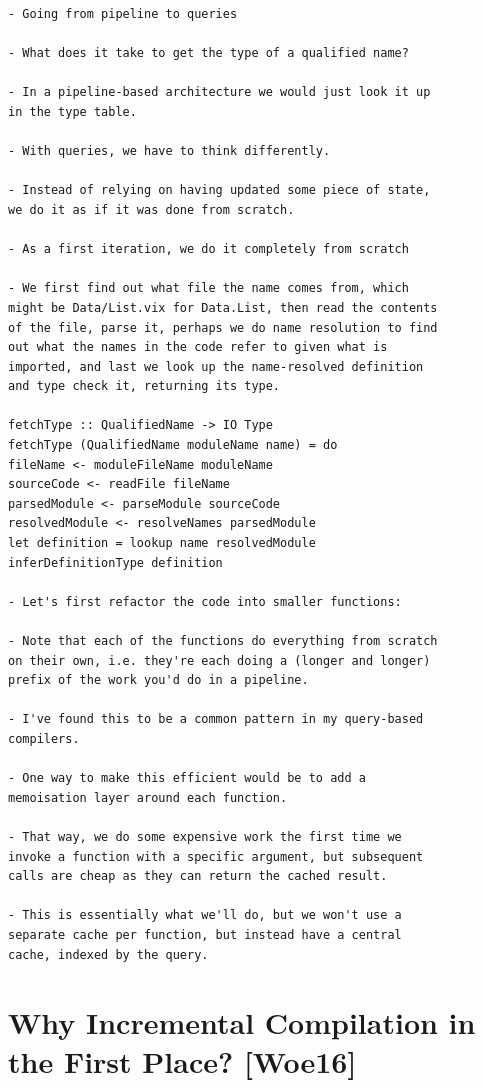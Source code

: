 \documentclass[12pt, a4paper]{report}
\begin{document}
\begin{verbatim}
- Going from pipeline to queries

- What does it take to get the type of a qualified name?

- In a pipeline-based architecture we would just look it up
in the type table.

- With queries, we have to think differently.

- Instead of relying on having updated some piece of state,
we do it as if it was done from scratch.

- As a first iteration, we do it completely from scratch

- We first find out what file the name comes from, which
might be Data/List.vix for Data.List, then read the contents
of the file, parse it, perhaps we do name resolution to find
out what the names in the code refer to given what is
imported, and last we look up the name-resolved definition
and type check it, returning its type.

fetchType :: QualifiedName -> IO Type
fetchType (QualifiedName moduleName name) = do
fileName <- moduleFileName moduleName
sourceCode <- readFile fileName
parsedModule <- parseModule sourceCode
resolvedModule <- resolveNames parsedModule
let definition = lookup name resolvedModule
inferDefinitionType definition

- Let's first refactor the code into smaller functions:

- Note that each of the functions do everything from scratch
on their own, i.e. they're each doing a (longer and longer)
prefix of the work you'd do in a pipeline.

- I've found this to be a common pattern in my query-based
compilers.

- One way to make this efficient would be to add a
memoisation layer around each function.

- That way, we do some expensive work the first time we
invoke a function with a specific argument, but subsequent
calls are cheap as they can return the cached result.

- This is essentially what we'll do, but we won't use a
separate cache per function, but instead have a central
cache, indexed by the query.
\end{verbatim}
\cite{olle_query_based}

\section*{Why Incremental Compilation in the First Place? [Woe16]}
\end{document}

